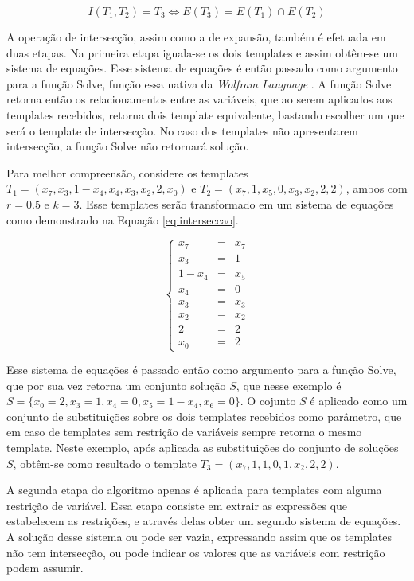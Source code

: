 \documentclass[12pt,a4paper]{article}
\begin{document}
	\begin{equation}
	I(T_1,T_2)=T_3 \Leftrightarrow E(T_3) = E(T_1) \cap E(T_2)
	\end{equation}

	A operação de intersecção, assim como a de expansão, também é efetuada em duas etapas. Na primeira etapa iguala-se os dois templates e assim obtêm-se um sistema de equações. Esse sistema de equações é então passado como argumento para a função Solve, função essa nativa da \textit{Wolfram Language} \cite{woframMathematica10}. A função Solve retorna então os relacionamentos entre as variáveis, que ao serem aplicados aos templates recebidos, retorna dois template equivalente, bastando escolher um que será o template de intersecção. No caso dos templates não apresentarem intersecção, a função Solve não retornará solução.

	Para melhor compreensão, considere os templates $T_1 = (x_7,x_3,1-x_4,x_4,x_3,x_2,2,x_0)$ e $T_2 = (x_7,1,x_5,0,x_3,x_2,2,2)$, ambos com $r=0.5$ e $k=3$. Esse templates serão transformado em um sistema de equações como demonstrado na Equação \ref{eq:interseccao}.

	\begin{equation}
	\left\{\begin{matrix}
	x_7   & = & x_7 \\ 
	x_3   & = & 1 \\ 
	1-x_4 & = & x_5    \\ 
	x_4   & = & 0    \\ 
	x_3   & = & x_3    \\ 
	x_2   & = & x_2   \\ 
	2     & = & 2   \\ 
	x_0   & = & 2
	\end{matrix}\right.
	\label{eq:interseccao}
	\end{equation}

	Esse sistema de equações é passado então como argumento para a função Solve, que por sua vez retorna um conjunto solução $S$, que nesse exemplo é $S = \{x_0 = 2, x_3 = 1, x_4 = 0, x_5 = 1 - x_4, x_6 = 0\}$. O cojunto $S$ é aplicado como um conjunto de substituições sobre os dois templates recebidos como parâmetro, que em caso de templates sem restrição de variáveis sempre retorna o mesmo template. Neste exemplo, após aplicada as substituições do conjunto de soluções $S$, obtêm-se como resultado o template $T_3 = (x_7, 1, 1, 0, 1, x_2, 2, 2)$.

	A segunda etapa do algoritmo apenas é aplicada para templates com alguma restrição de variável. Essa etapa consiste em extrair as expressões que estabelecem as restrições, e através delas obter um segundo sistema de equações. A solução desse sistema ou pode ser vazia, expressando assim que os templates não tem intersecção, ou pode indicar os valores que as variáveis com restrição podem assumir.
\end{document}
